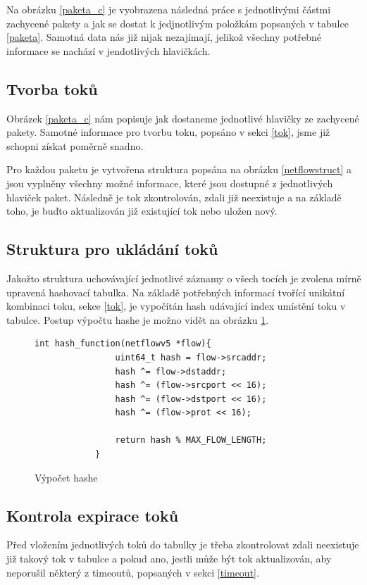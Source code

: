 \documentclass[11pt, a4paper, hidelinks]{article}[08.10.2023]
\begin{document}
    Na obrázku \ref{paketa_c} je vyobrazena následná práce s jednotlivými částmi zachycené pakety a jak se dostat k jedjnotlivým položkám popsaných v tabulce \ref{paketa}. Samotná data nás již nijak nezajímají, jelikož všechny potřebné informace se nachází v jendotlivých hlavičkách\cite{Pcap_general}.

    \subsection{Tvorba toků}
    Obrázek \ref{paketa_c} nám popisuje jak dostaneme jednotlivé hlavičky ze zachycené pakety. Samotné informace pro tvorbu toku, popsáno v sekci \ref{tok}, jsme již schopni získat poměrně snadno.

    Pro každou paketu je vytvořena struktura popsána na obrázku \ref{netflowstruct} a jsou vyplněny všechny možné informace, které jsou dostupné z jednotlivých hlaviček paket. Následně je tok zkontrolován, zdali již neexistuje a na základě toho, je buďto aktualizován již existující tok nebo uložen nový.

    \subsection{Struktura pro ukládání toků}
    Jakožto struktura uchovávající jednotlivé záznamy o všech tocích je zvolena mírně upravená hashovací tabulka. Na základě potřebných informací tvořící unikátní kombinaci toku, sekce \ref{tok}, je vypočítán hash udávající index umístění toku v tabulce. Postup výpočtu hashe je možno vidět na obrázku \ref{hash}.

     \begin{figure}[H]
        \centering
        \begin{lstlisting}[style=CStyle]
            int hash_function(netflowv5 *flow){
                uint64_t hash = flow->srcaddr;
                hash ^= flow->dstaddr;
                hash ^= (flow->srcport << 16);
                hash ^= (flow->dstport << 16);
                hash ^= (flow->prot << 16);
            
                return hash % MAX_FLOW_LENGTH;
            }
        \end{lstlisting}
        \caption{Výpočet hashe}
        \label{hash}
    \end{figure}

    \subsection{Kontrola expirace toků}\label{kontrola}
    Před vložením jednotlivých toků do tabulky je třeba zkontrolovat zdali neexistuje již takový tok v tabulce a pokud ano, jestli může být tok aktualizován, aby neporušil některý z timeoutů, popsaných v sekci \ref{timeout}.
\end{document}
